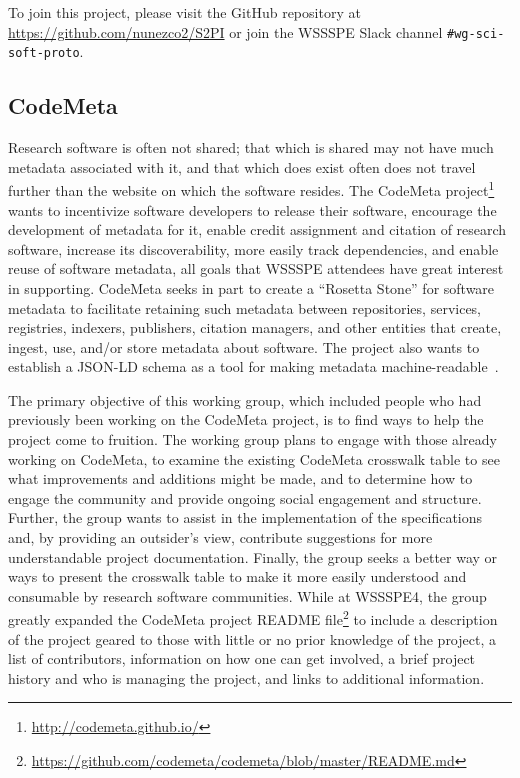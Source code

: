 \documentclass[11pt, oneside]{amsart}
\newcommand{\note}[1]{ {\textcolor{blueish}    { ***Note:      #1 }}}
\begin{document}
To join this project, please visit the GitHub repository at
\url{https://github.com/nunezco2/S2PI} or join the WSSSPE Slack channel
\texttt{\#wg-sci-soft-proto}.


\subsection{CodeMeta}
\label{sec:CodeMeta}


Research software is often not shared; that which is shared may not have much metadata associated with it, and that which does exist often does not travel further than the website on which the software resides. The CodeMeta project\footnote{\url{http://codemeta.github.io/}} wants to incentivize software developers to release their software, encourage the development of metadata for it, enable credit assignment and citation of research software, increase its discoverability, more easily track dependencies, and enable reuse of software metadata, all goals that WSSSPE attendees have great interest in supporting.  CodeMeta seeks in part to create a ``Rosetta Stone'' for software metadata to facilitate retaining such metadata between repositories, services, registries, indexers, publishers, citation managers, and other entities that create, ingest, use, and/or store metadata about software. The project also wants to establish a JSON-LD schema as a tool for making metadata machine-readable~\cite{CodeMeta_schema}.

The primary objective of this working group, which included people who had previously been working on the CodeMeta project, is to find ways to help the project come to fruition.
%
The working group plans to engage with those already working on CodeMeta, to examine the existing CodeMeta crosswalk table to see what improvements and additions might be made, and to determine how to engage the community and provide ongoing social engagement and structure. Further, the group wants to assist in the implementation of the specifications and, by providing an outsider's view, contribute suggestions for more understandable project documentation. Finally, the group seeks a better way or ways to present the crosswalk table to make it more easily understood and consumable by research software communities.
%
While at WSSSPE4, the group greatly expanded the CodeMeta project README file\footnote{\url{https://github.com/codemeta/codemeta/blob/master/README.md}} to include a description of the project geared to those with little or no prior knowledge of the project, a list of contributors, information on how one can get involved, a brief project history and who is managing the project, and links to additional information.
\end{document}

